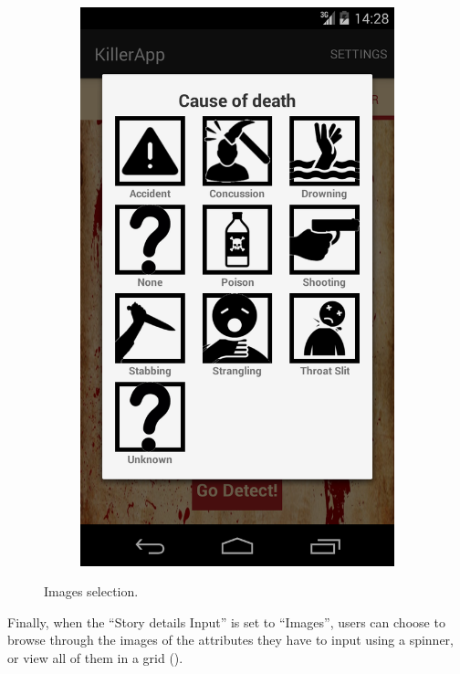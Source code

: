 \documentclass{mproj}
\begin{document}
\begin{figure}[h]
\begin{subfigure}{0.25\textwidth}
		\includegraphics[width=\textwidth]{images/grid_selector}
	\end{subfigure}			
	\caption{Images selection.}
	\label{fig:images_selection}
\end{figure}

Finally, when the ``Story details Input'' is set to ``Images'', users can choose to browse through the images of the attributes they have to input using a spinner, or view all of them in a grid ().
\end{document}
